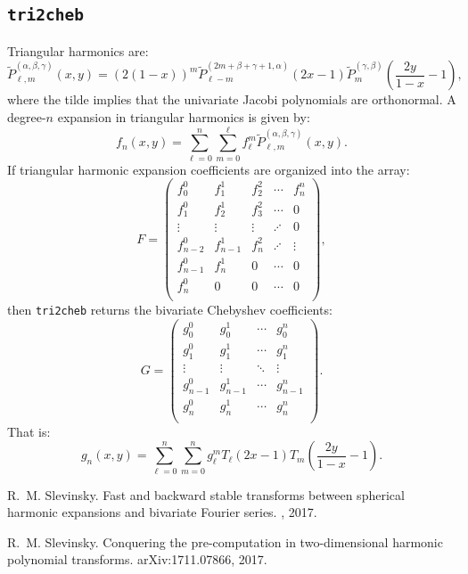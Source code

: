 \documentclass{article}
\begin{document}
\subsection{{\tt tri2cheb}}

Triangular harmonics are:
\begin{equation}
\tilde{P}_{\ell,m}^{(\alpha,\beta,\gamma)}(x,y) = (2(1-x))^m \tilde{P}_{\ell-m}^{(2m+\beta+\gamma+1,\alpha)}(2x-1) \tilde{P}_m^{(\gamma,\beta)}\left(\frac{2y}{1-x}-1\right),
\end{equation}
where the tilde implies that the univariate Jacobi polynomials are orthonormal. A degree-$n$ expansion in triangular harmonics is given by:
\begin{equation}
f_n(x,y) = \sum_{\ell=0}^{n}\sum_{m = 0}^\ell f_\ell^m \tilde{P}_{\ell,m}^{(\alpha,\beta,\gamma)}(x,y).
\end{equation}
If triangular harmonic expansion coefficients are organized into the array:
\[
F = \begin{pmatrix}
f_0^0 & f_1^1 & f_2^2 & \cdots & f_n^n\\
f_1^0 & f_2^1 & f_3^2 & \cdots & 0\\
\vdots & \vdots &  \vdots & \iddots & 0\\
f_{n-2}^0 & f_{n-1}^1 & f_n^2 & \iddots & \vdots\\
f_{n-1}^0 & f_n^1 & 0 & \cdots & 0\\
f_n^0 & 0 & 0 & \cdots & 0\\
\end{pmatrix},
\]
then {\tt tri2cheb} returns the bivariate Chebyshev coefficients:
\[
G = \begin{pmatrix}
g_0^0 & g_0^1 & \cdots & g_0^n\\
g_1^0 & g_1^1 & \cdots & g_1^n\\
\vdots & \vdots & \ddots & \vdots\\
g_{n-1}^0 & g_{n-1}^1& \cdots & g_{n-1}^n\\
g_n^0 & g_n^1 & \cdots & g_n^n\\
\end{pmatrix}.
\]
That is:
\[
g_n(x,y) = \sum_{\ell=0}^n\sum_{m=0}^n g_\ell^m T_\ell(2x-1) T_m\left(\frac{2y}{1-x}-1\right).
\]

\begin{thebibliography}{1}

R.~M. Slevinsky.
\newblock Fast and backward stable transforms between spherical harmonic
  expansions and bivariate {F}ourier series.
, 2017.

R.~M. Slevinsky.
\newblock Conquering the pre-computation in two-dimensional harmonic polynomial
  transforms.
\newblock arXiv:1711.07866, 2017.

\end{thebibliography}
\end{document}

